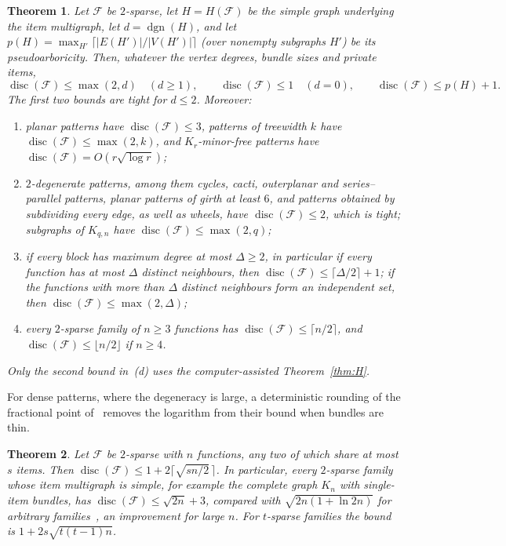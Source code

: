 \documentclass[11pt,letterpaper]{article}
\newtheorem{theorem}{Theorem}[section]
\theoremstyle{definition}
\newcommand{\cF}{\mathcal{F}}
\DeclareMathOperator{\disc}{disc}
\begin{document}
\begin{theorem}\label{thm:F}
Let $\cF$ be $2$-sparse, let $H=H(\cF)$ be the simple graph underlying the item multigraph, let
$d=\operatorname{dgn}(H)$, and let $p(H)=\max_{H'}\lceil|E(H')|/|V(H')|\rceil$ (over nonempty subgraphs
$H'$) be its pseudoarboricity. Then, whatever the vertex degrees, bundle sizes and private items,
\[
  \disc(\cF)\le\max(2,d)\quad(d\ge1),\qquad\disc(\cF)\le1\quad(d=0),\qquad\disc(\cF)\le p(H)+1 .
\]
The first two bounds are tight for $d\le2$. Moreover:
\begin{enumerate}[label=(\alph*),itemsep=0pt]
\item planar patterns have $\disc(\cF)\le3$, patterns of treewidth $k$ have $\disc(\cF)\le\max(2,k)$, and
$K_r$-minor-free patterns have $\disc(\cF)=O(r\sqrt{\log r})$;
\item $2$-degenerate patterns, among them cycles, cacti, outerplanar and series--parallel patterns,
planar patterns of girth at least $6$, and patterns obtained by subdividing every edge, as well as
wheels, have $\disc(\cF)\le2$, which is tight; subgraphs of $K_{q,n}$ have $\disc(\cF)\le\max(2,q)$;
\item if every block has maximum degree at most $\Delta\ge2$, in particular if every function has at most
$\Delta$ distinct neighbours, then $\disc(\cF)\le\lceil\Delta/2\rceil+1$; if the functions with more than
$\Delta$ distinct neighbours form an independent set, then $\disc(\cF)\le\max(2,\Delta)$;
\item every $2$-sparse family of $n\ge3$ functions has $\disc(\cF)\le\lceil n/2\rceil$, and
$\disc(\cF)\le\lfloor n/2\rfloor$ if $n\ge4$.
\end{enumerate}
Only the second bound in~(d) uses the computer-assisted Theorem~\ref{thm:H}.
\end{theorem}

For dense patterns, where the degeneracy is large, a deterministic rounding of the fractional point
of~\cite{HMMS25} removes the logarithm from their bound when bundles are thin.

\begin{theorem}\label{thm:dense}
Let $\cF$ be $2$-sparse with $n$ functions, any two of which share at most $s$ items. Then
$\disc(\cF)\le1+2\lceil\sqrt{sn/2}\,\rceil$. In particular, every $2$-sparse family whose item
multigraph is simple, for example the complete graph $K_n$ with single-item bundles, has
$\disc(\cF)\le\sqrt{2n}+3$, compared with $\sqrt{2n(1+\ln2n)}$ for arbitrary
families~\cite{HMMS25}, an improvement for large $n$. For $t$-sparse families the bound is $1+2s\sqrt{t(t-1)n}$.
\end{theorem}
\end{document}
